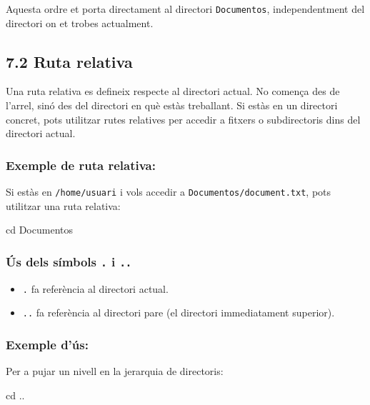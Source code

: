 \documentclass[
  12 pt,
  a4paper,
]{article}
\newenvironment{Shaded}{\begin{snugshade}}{\end{snugshade}}
\newcommand{\BuiltInTok}[1]{#1}
\newcommand{\NormalTok}[1]{#1}
\providecommand{\tightlist}{%
  \setlength{\itemsep}{0pt}\setlength{\parskip}{0pt}}
\begin{document}
Aquesta ordre et porta directament al directori \texttt{Documentos},
independentment del directori on et trobes actualment.

\subsection{7.2 Ruta relativa}\label{ruta-relativa}

Una ruta relativa es defineix respecte al directori actual. No comença
des de l'arrel, sinó des del directori en què estàs treballant. Si estàs
en un directori concret, pots utilitzar rutes relatives per accedir a
fitxers o subdirectoris dins del directori actual.

\subsubsection{Exemple de ruta
relativa:}\label{exemple-de-ruta-relativa}

Si estàs en \texttt{/home/usuari} i vols accedir a
\texttt{Documentos/document.txt}, pots utilitzar una ruta relativa:

\begin{Shaded}
\begin{Highlighting}[]
\BuiltInTok{cd}\NormalTok{ Documentos}
\end{Highlighting}
\end{Shaded}

\subsubsection{\texorpdfstring{Ús dels símbols \texttt{.} i
\texttt{..}}{Ús dels símbols . i ..}}\label{uxfas-dels-suxedmbols-.-i-..}

\begin{itemize}
\tightlist
\item
  \texttt{.} fa referència al directori actual.
\item
  \texttt{..} fa referència al directori pare (el directori
  immediatament superior).
\end{itemize}

\subsubsection{Exemple d'ús:}\label{exemple-duxfas-1}

Per a pujar un nivell en la jerarquia de directoris:

\begin{Shaded}
\begin{Highlighting}[]
\BuiltInTok{cd}\NormalTok{ ..}
\end{Highlighting}
\end{Shaded}
\end{document}
